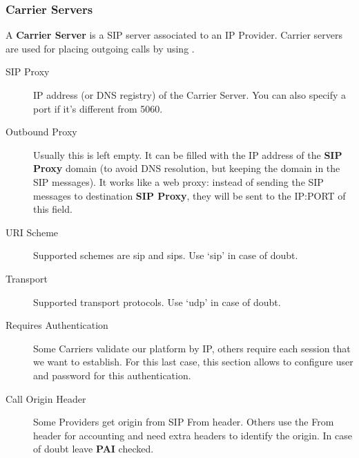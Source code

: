 \documentclass[letterpaper,10pt,english]{sphinxmanual}
\begin{document}
\subsubsection{Carrier Servers}
\label{administration_portal/brand/providers/carriers:carrier-servers}
A \textbf{Carrier Server} is a SIP server associated to an IP Provider. Carrier servers
are used for placing outgoing calls by using {\hyperref[administration_portal/brand/routing/outgoing_routings:outgoing\string-routings]{}}.
\begin{description}
\item[{SIP Proxy}] \leavevmode{}\label{administration_portal/brand/providers/carriers:term-sip-proxy}
IP address (or DNS registry) of the Carrier Server. You can also specify
a port if it's different from 5060.

\item[{Outbound Proxy}] \leavevmode{}\label{administration_portal/brand/providers/carriers:term-outbound-proxy}
Usually this is left empty. It can be filled with the IP address of the
\textbf{SIP Proxy} domain (to avoid DNS resolution, but keeping the domain
in the SIP messages). It works like a web proxy: instead of sending the
SIP messages to destination \textbf{SIP Proxy}, they will be sent to the
IP:PORT of this field.

\item[{URI Scheme}] \leavevmode{}\label{administration_portal/brand/providers/carriers:term-uri-scheme}
Supported schemes are sip and sips. Use `sip' in case of doubt.

\item[{Transport}] \leavevmode{}\label{administration_portal/brand/providers/carriers:term-transport}
Supported transport protocols. Use `udp' in case of doubt.

\item[{Requires Authentication}] \leavevmode{}\label{administration_portal/brand/providers/carriers:term-requires-authentication}
Some Carriers validate our platform by IP, others require
each session that we want to establish. For this last case, this section
allows to configure user and password for this authentication.

\item[{Call Origin Header}] \leavevmode{}\label{administration_portal/brand/providers/carriers:term-call-origin-header}
Some Providers get origin from SIP From header. Others use the From
header for accounting and need extra headers to identify the origin.
In case of doubt leave \textbf{PAI} checked.


\end{description}
\end{document}
